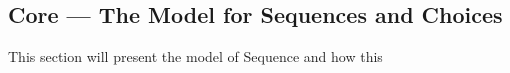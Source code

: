 \subsection{Core --- The Model for Sequences and Choices}

This section will present the model of Sequence and how this